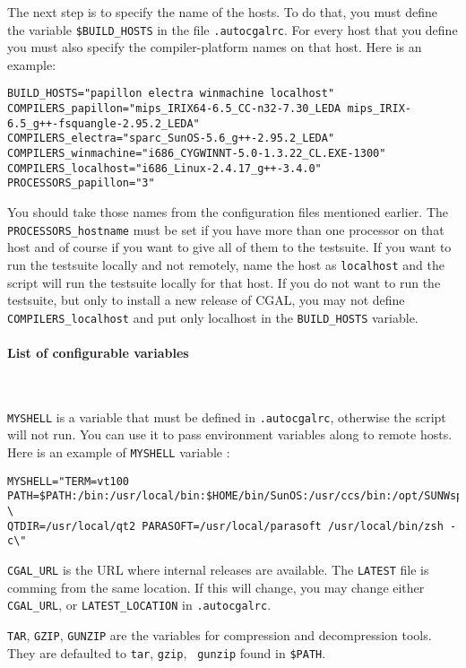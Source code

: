 The next step is to specify the name of the hosts. To do that, you must define
the variable {\tt \$BUILD\_HOSTS} in the file {\tt .autocgalrc}. For every
host that you define you must also specify the compiler-platform names on that
host.  Here is an example:
\begin{verbatim}
BUILD_HOSTS="papillon electra winmachine localhost"
COMPILERS_papillon="mips_IRIX64-6.5_CC-n32-7.30_LEDA mips_IRIX-6.5_g++-fsquangle-2.95.2_LEDA"
COMPILERS_electra="sparc_SunOS-5.6_g++-2.95.2_LEDA"
COMPILERS_winmachine="i686_CYGWINNT-5.0-1.3.22_CL.EXE-1300"
COMPILERS_localhost="i686_Linux-2.4.17_g++-3.4.0"
PROCESSORS_papillon="3"
\end{verbatim}
You should take those names from the configuration files mentioned earlier.
The {\tt PROCESSORS\_hostname} must be set if you have more than one 
processor on that host and of course if you want to give all of them to the 
testsuite. If you want to run the testsuite locally and not remotely, name the 
host as {\tt localhost} and the script will run the testsuite locally for that
host. If you do not want to run the testsuite, but only to install a new release of CGAL, you may not define {\tt COMPILERS\_localhost} and put only localhost in the {\tt BUILD\_HOSTS} variable.

\paragraph{List of configurable variables} ~

{\tt MYSHELL} is a variable that must be defined in {\tt .autocgalrc},
otherwise the script will not run.  You can use it to pass environment
variables along to remote hosts.  Here is an example of {\tt MYSHELL}
variable :
\begin{verbatim}
MYSHELL="TERM=vt100 PATH=$PATH:/bin:/usr/local/bin:$HOME/bin/SunOS:/usr/ccs/bin:/opt/SUNWspro/bin \
QTDIR=/usr/local/qt2 PARASOFT=/usr/local/parasoft /usr/local/bin/zsh -c\"
\end{verbatim}

{\tt CGAL\_URL} is the URL where internal releases are available.
The {\tt LATEST} file is comming from the same location. If this will change,
you may change either {\tt CGAL\_URL}, or {\tt LATEST\_LOCATION}
in {\tt .autocgalrc}.

{\tt TAR}, {\tt GZIP}, {\tt GUNZIP} are the variables for compression and
decompression tools.  They are defaulted to {\tt tar}, {\tt gzip}, {\tt
gunzip} found in {\tt \$PATH}.

